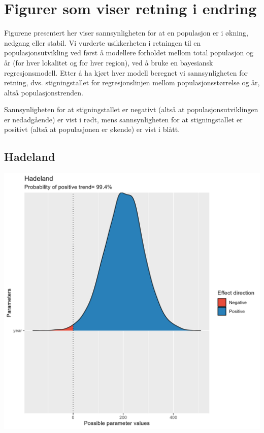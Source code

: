 \documentclass[
  letterpaper,
  DIV=11,
  numbers=noendperiod]{scrreport}
\begin{document}

\hypertarget{figurer-som-viser-retning-i-endring}{%
\chapter{Figurer som viser retning i
endring}\label{figurer-som-viser-retning-i-endring}}

Figurene presentert her viser sannsynligheten for at en populasjon er i
økning, nedgang eller stabil. Vi vurderte usikkerheten i retningen til
en populasjonsutvikling ved først å modellere forholdet mellom total
populasjon og år (for hver lokalitet og for hver region), ved å bruke en
bayesiansk regresjonsmodell. Etter å ha kjørt hver modell beregnet vi
sannsynligheten for retning, dvs. stigningstallet for regresjonslinjen
mellom populasjonsstørrelse og år, altså populasjonstrenden.

Sannsynligheten for at stigningstallet er negativt (altså at
populasjonsutviklingen er nedadgående) er vist i rødt, mens
sannsynligheten for at stigningstallet er positivt (altså at
populasjonen er økende) er vist i blått.

\hypertarget{hadeland-2}{%
\section{Hadeland}\label{hadeland-2}}

\includegraphics{data/derived_data/direction_plots/plots/Hadeland.png}
\end{document}
